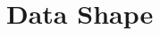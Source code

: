 \documentclass{turabian-thesis}
\begin{document}
























\section{Data Shape}
\end{document}
